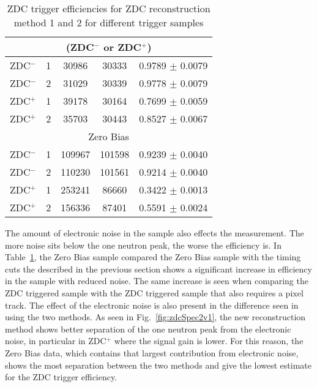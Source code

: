 \begin{table}
\begin{tabular}{|c|c|c|c|c|}
           \multicolumn{5}{|c|}{(ZDC$^{-}$ or ZDC$^{+}$)} \\ \hline 
           ZDC$^{-}$ & 1 & 30986 & 30333 & 0.9789 $\pm$ 0.0079 \\ \hline
           ZDC$^{-}$ & 2 & 31029 & 30339 & 0.9778 $\pm$ 0.0079 \\ \hline
           ZDC$^{+}$ & 1 & 39178 & 30164 & 0.7699 $\pm$ 0.0059 \\ \hline
           ZDC$^{+}$ & 2 & 35703 & 30443 & 0.8527 $\pm$ 0.0067 \\ \hline
           \multicolumn{5}{|c|}{ Zero Bias} \\ \hline 
           ZDC$^{-}$ & 1 & 109967  & 101598  & 0.9239 $\pm$ 0.0040 \\ \hline
           ZDC$^{-}$ & 2 & 110230  & 101561  & 0.9214 $\pm$ 0.0040 \\ \hline
           ZDC$^{+}$ & 1 & 253241  & 86660  & 0.3422 $\pm$ 0.0013 \\ \hline
           ZDC$^{+}$ & 2 & 156336  & 87401  & 0.5591 $\pm$ 0.0024 \\ \hline
        \end{tabular}
        \caption{ZDC trigger efficiencies for ZDC reconstruction method 1 and 
          2 for different trigger samples}
        \label{tab:zdcEfficiencySys}
      \end{table}

      The amount of electronic noise in the sample also effects the measurement.
      The more noise sits below the one neutron peak, the worse the efficiency 
        is. 
      In Table~\ref{tab:zdcEfficiencySys}, the Zero Bias sample compared the 
        Zero Bias sample with the timing cuts the described in the previous 
        section shows a significant increase in efficiency in the sample
        with reduced noise. 
      The same increase is seen when comparing the ZDC triggered sample with 
        the ZDC triggered sample that also requires a pixel track. 
      The effect of the electronic noise is also present in the difference seen
        in using the two methods.
      As seen in Fig.~\ref{fig:zdcSpec2v1}, the new reconstruction method 
        shows better separation of the one neutron peak from the electronic 
        noise, in particular in ZDC$^{+}$ where the signal gain is lower.
      For this reason, the Zero Bias data, which contains that largest 
        contribution from electronic noise, shows the most separation between 
        the two methods and give the lowest estimate for the ZDC trigger 
        efficiency.

